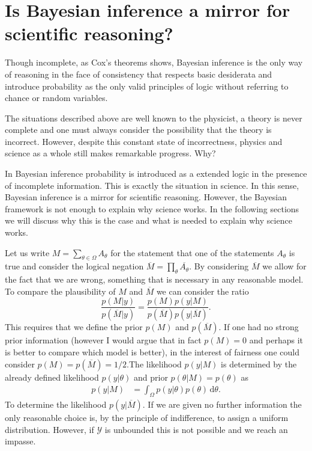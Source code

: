 \documentclass[
    a4paper,
    DIV=14,
    abstract=true,
    numbers=noenddot
]
{scrartcl}
\theoremstyle{definition}
\renewcommand{\d}{\,\mathrm{d}}\newcommand{\dx}{\,\mathrm{d}x}
\newcommand{\Yy}{\mathcal{Y}}
\begin{document}
\section{Is Bayesian inference a mirror for scientific reasoning?}

Though incomplete, as Cox's theorems \cite{van2003constructing} shows, Bayesian inference is the only way of reasoning in the face of consistency that respects basic desiderata and introduce probability as the only valid principles of logic without referring to chance or random variables.

The situations described above are well known to the physicist, a theory is never complete and one must always consider the possibility that the theory is incorrect. However, despite this constant state of incorrectness, physics and science as a whole still makes remarkable progress. Why?

In Bayesian inference probability is introduced as a extended logic in the presence of incomplete information. This is exactly the situation in science. In this sense, Bayesian inference is a mirror for scientific reasoning. However, the Bayesian framework is not enough to explain why science works. In the following sections we will discuss why this is the case and what is needed to explain why science works.


Let us write $M= \sum_{\theta \in \Omega } A_\theta $ for the statement that one of the statements $A_\theta $ is true and consider the logical negation $\overline{M}= \prod_{\theta }\overline{A_\theta}$. By considering $\overline{M}$ we allow for the fact that we are wrong, something that is necessary in any reasonable model. To compare the plausibility of $M$ and $\overline{M}$ we can consider the ratio
\begin{equation}
    \frac{p(M|y)}{p(\overline{M}|y)}= \frac{p(M)p(y|M)}{p(\overline{M})p(y|\overline{M})}.
\end{equation}
This requires that we define the prior $p(M)$ and $p(\overline{M})$. If one had no strong prior information (however I would argue that in fact $p(M)=0$ and perhaps it is better to compare which model is better), in the interest of fairness one could consider $p(M)=p(\overline{M})=1/2$.The likelihood $p(y|M)$ is determined by the already defined likelihood $p(y|\theta )$ and prior $p(\theta|M)=  p(\theta )$ as
\begin{align*}
    p(y|M) & = \int_{\Omega } p(y|\theta )p(\theta)\d \theta.
\end{align*}
To determine the likelihood $p(y|\overline{M})$. If we are given no further information the only reasonable choice is, by the principle of indifference, to assign a uniform distribution. However, if $\Yy $ is unbounded this is not possible and we reach an impasse.
\end{document}
